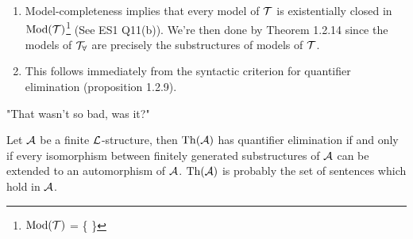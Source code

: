 \documentclass{article}
\numberwithin{thm}{subsection}
\begin{document}
\begin{enumerate}
    \item[$(d) \Rightarrow (e)$] Model-completeness implies that every model of $\mathcal{T}$ is existentially closed in $\operatorname{Mod}(\mathcal{T})$\footnote{$\operatorname{Mod}(\mathcal{T})$ = \{ \} } (See ES1 Q11(b)). We're then done by Theorem 1.2.14 since the models of $\mathcal{T}_{\forall}$ are precisely the substructures of models of $\mathcal{T}$.
    \item[$(e) \Rightarrow (a)$] This follows immediately from the syntactic criterion for quantifier elimination (proposition 1.2.9).
 \end{enumerate}
"That wasn't so bad, was it?"
\endproof
\begin{corr}{}
    Let $\mathcal{A}$ be a finite $\mathcal{L}$-structure, then $\operatorname{Th}(\mathcal{A})$ has quantifier elimination if and only if every isomorphism between finitely generated substructures of $\mathcal{A}$ can be extended to an automorphism of $\mathcal{A}$. \gap $\operatorname{Th}(\mathcal{A})$ is probably the set of sentences which hold in $\mathcal{A}$.
\end{corr}
\end{document}
